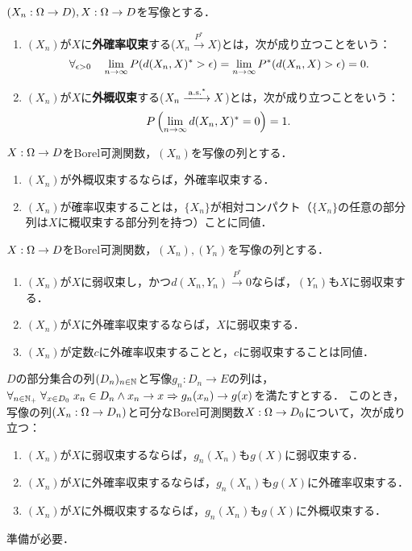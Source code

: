 \documentclass[uplatex,dvipdfmx]{jsreport}
\begin{document}
\begin{definition}
    $(X_n:\Omega\to D),X:\Omega\to D$を写像とする．
    \begin{enumerate}
        \item $(X_n)$が$X$に\textbf{外確率収束}する($X_n\xrightarrow{P^*}X$)とは，次が成り立つことをいう：
        \[\forall_{\epsilon>0}\quad\lim_{n\to\infty} P(d(X_n,X)^*>\epsilon)=\lim_{n\to\infty} P^*(d(X_n,X)>\epsilon)=0.\]
        \item $(X_n)$が$X$に\textbf{外概収束}する($X_n\xrightarrow{\;\mathrm{a.s.}^*}X$)とは，次が成り立つことをいう：
        \[P\left(\lim_{n\to\infty} d(X_n,X)^*=0\right)=1.\]
    \end{enumerate}
\end{definition}

\begin{lemma}
    $X:\Omega\to D$をBorel可測関数，$(X_n)$を写像の列とする．
    \begin{enumerate}
        \item $(X_n)$が外概収束するならば，外確率収束する．
        \item $(X_n)$が確率収束することは，$\{X_n\}$が相対コンパクト（$\{X_n\}$の任意の部分列は$X$に概収束する部分列を持つ）ことに同値．
    \end{enumerate}
\end{lemma}

\begin{lemma}\label{lemma-確率収束と弱収束}
    $X:\Omega\to D$をBorel可測関数，$(X_n),(Y_n)$を写像の列とする．
    \begin{enumerate}
        \item $(X_n)$が$X$に弱収束し，かつ$d(X_n,Y_n)\xrightarrow{P^*}0$ならば，$(Y_n)$も$X$に弱収束する．
        \item $(X_n)$が$X$に外確率収束するならば，$X$に弱収束する．
        \item $(X_n)$が定数$c$に外確率収束することと，$c$に弱収束することは同値．
    \end{enumerate}
\end{lemma}

\begin{theorem}[連続写像定理の拡張]
    $D$の部分集合の列$(D_n)_{n\in\mathbb{N}}$と写像$g_n:D_n\to E$の列は，$\forall_{n\in\mathbb{N}_+}\;\forall_{x\in D_0}\;x_n\in D_n\land x_n\to x\Rightarrow g_n(x_n)\to g(x)$を満たすとする．
    このとき，写像の列$(X_n:\Omega\to D_n)$と可分なBorel可測関数$X:\Omega\to D_0$について，次が成り立つ：
    \begin{enumerate}
        \item $(X_n)$が$X$に弱収束するならば，$g_n(X_n)$も$g(X)$に弱収束する．
        \item $(X_n)$が$X$に外確率収束するならば，$g_n(X_n)$も$g(X)$に外確率収束する．
        \item $(X_n)$が$X$に外概収束するならば，$g_n(X_n)$も$g(X)$に外概収束する．
    \end{enumerate}
\end{theorem}
\begin{remarks}
    準備が必要．
\end{remarks}
\end{document}
